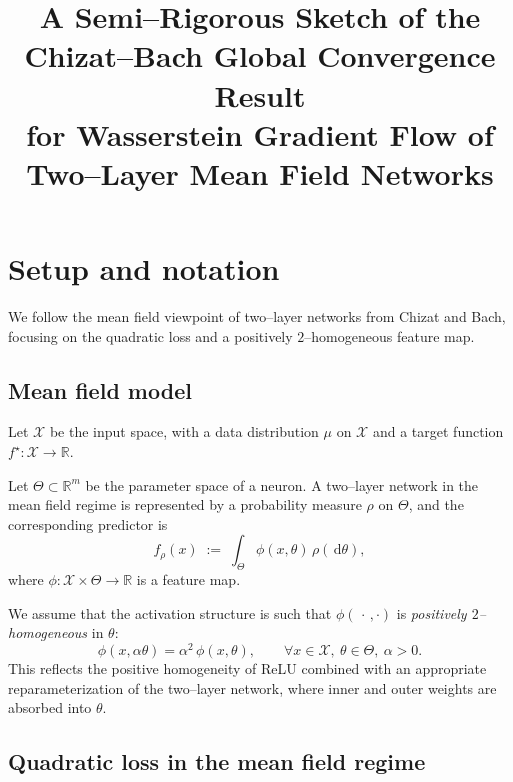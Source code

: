 \documentclass[11pt]{article}
\numberwithin{equation}{section}
\theoremstyle{definition}
\newcommand{\R}{\mathbb{R}}
\newcommand{\dd}{\,\mathrm{d}}
\newcommand{\1}{\mathbbm{1}}
\begin{document}
\title{A Semi--Rigorous Sketch of the Chizat--Bach Global Convergence Result\\
for Wasserstein Gradient Flow of Two--Layer Mean Field Networks}
\author{}
\date{}
\maketitle

\section{Setup and notation}

We follow the mean field viewpoint of two--layer networks from Chizat and Bach, focusing on the quadratic loss and a positively $2$--homogeneous feature map.

\subsection{Mean field model}

Let $\mathcal{X}$ be the input space, with a data distribution $\mu$ on $\mathcal{X}$ and a target function $f^\star:\mathcal{X}\to\R$.

Let $\Theta\subset\R^m$ be the parameter space of a neuron. A two--layer network in the mean field regime is represented by a probability measure $\rho$ on $\Theta$, and the corresponding predictor is
\begin{equation}
\label{eq:mean-field-model}
f_\rho(x) \;:=\; \int_{\Theta} \phi(x,\theta)\,\rho(\dd\theta),
\end{equation}
where $\phi:\mathcal{X}\times\Theta\to\R$ is a feature map.

We assume that the activation structure is such that $\phi(\,\cdot\,,\cdot)$ is \emph{positively $2$--homogeneous} in $\theta$:
\begin{equation}
\label{eq:2-homog-phi}
\phi(x,\alpha\theta) = \alpha^2\,\phi(x,\theta), 
\qquad \forall x\in\mathcal{X},\ \theta\in\Theta,\ \alpha>0.
\end{equation}
This reflects the positive homogeneity of ReLU combined with an appropriate reparameterization of the two--layer network, where inner and outer weights are absorbed into $\theta$.

\subsection{Quadratic loss in the mean field regime}
\end{document}
